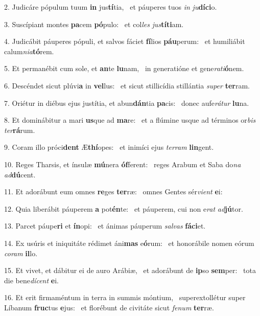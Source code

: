 2. Judicáre pópulum tuum \textbf{in} jus\textbf{tí}tia, \ast\  et páuperes tuos \textit{in} \textit{ju}\textbf{dí}\textbf{ci}o.\

3. Suscípiant montes \textbf{pa}cem \textbf{pó}pulo: \ast\  et col\textit{les} \textit{jus}\textbf{tí}\textbf{ti}am.\

4. Judicábit páuperes pópuli, et salvos fáciet \textbf{fí}lios \textbf{páu}perum: \ast\  et humiliábit calum\textit{ni}\textit{a}\textbf{tó}rem.\

5. Et permanébit cum sole, et \textbf{an}te \textbf{lu}nam, \ast\  in generatióne et gene\textit{ra}\textit{ti}\textbf{ó}nem.\

6. Descéndet sicut plúvi\textbf{a} in \textbf{vel}lus: \ast\  et sicut stillicídia stillántia \textit{su}\textit{per} \textbf{ter}ram.\

7. Oriétur in diébus ejus justítia, et abun\textbf{dán}tia \textbf{pa}cis: \ast\  donec aufe\textit{rá}\textit{tur} \textbf{lu}na.\

8. Et dominábitur a mari \textbf{us}que ad \textbf{ma}re: \ast\  et a flúmine usque ad términos or\textit{bis} \textit{ter}\textbf{rá}rum.\

9. Coram illo próci\textbf{dent} Æ\textbf{thí}opes: \ast\  et inimíci ejus \textit{ter}\textit{ram} \textbf{lin}gent.\

10. Reges Tharsis, et ínsulæ \textbf{mú}nera \textbf{óf}ferent: \ast\  reges Arabum et Saba do\textit{na} \textit{ad}\textbf{dú}cent.\

11. Et adorábunt eum omnes \textbf{re}ges \textbf{ter}ræ: \ast\  omnes Gentes sér\textit{vi}\textit{ent} \textbf{e}i:\

12. Quia liberábit páuperem \textbf{a} pot\textbf{én}te: \ast\  et páuperem, cui non e\textit{rat} \textit{ad}\textbf{jú}tor.\

13. Parcet páupe\textbf{ri} et \textbf{ín}opi: \ast\  et ánimas páuperum \textit{sal}\textit{vas} \textbf{fá}\textbf{ci}et.\

14. Ex usúris et iniquitáte rédimet áni\textbf{mas} e\textbf{ó}rum: \ast\  et honorábile nomen eórum \textit{co}\textit{ram} \textbf{il}lo.\

15. Et vivet, et dábitur ei de auro Arábiæ, \dag\  et adorábunt de \textbf{ip}so \textbf{sem}per: \ast\  tota die bene\textit{dí}\textit{cent} \textbf{e}i.\

16. Et erit firmaméntum in terra in summis móntium, \dag\  superextollétur super Líbanum \textbf{fruc}tus \textbf{e}jus: \ast\  et florébunt de civitáte sicut \textit{fe}\textit{num} \textbf{ter}ræ.\

